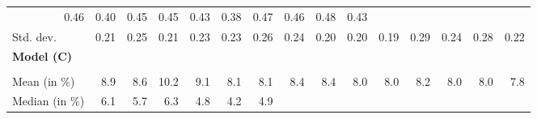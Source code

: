 \begin{tabular}{lllllllllllllll}
  \multicolumn{1}{r}{0.46} &
  \multicolumn{1}{r}{0.40} &
  \multicolumn{1}{r}{0.45} &
  \multicolumn{1}{r}{0.45} &
  \multicolumn{1}{r}{0.43} &
  \multicolumn{1}{r}{0.38} &
  \multicolumn{1}{r}{0.47} &
  \multicolumn{1}{r}{0.46} &
  \multicolumn{1}{r}{0.48} &
  \multicolumn{1}{r}{0.43} \\
\multicolumn{1}{l}{\hspace{2em}Std. dev.} &
  \multicolumn{1}{|r}{0.21} &
  \multicolumn{1}{r}{0.25} &
  \multicolumn{1}{r}{0.21} &
  \multicolumn{1}{r}{0.23} &
  \multicolumn{1}{r}{0.23} &
  \multicolumn{1}{r}{0.26} &
  \multicolumn{1}{r}{0.24} &
  \multicolumn{1}{r}{0.20} &
  \multicolumn{1}{r}{0.20} &
  \multicolumn{1}{r}{0.19} &
  \multicolumn{1}{r}{0.29} &
  \multicolumn{1}{r}{0.24} &
  \multicolumn{1}{r}{0.28} &
  \multicolumn{1}{r}{0.22} \\ \hline
\multicolumn{1}{l}{{\textbf{Model (C)}}} &
  \multicolumn{1}{|r}{} &
  \multicolumn{1}{r}{} &
  \multicolumn{1}{r}{} &
  \multicolumn{1}{r}{} &
  \multicolumn{1}{r}{} &
  \multicolumn{1}{r}{} &
  \multicolumn{1}{r}{} &
  \multicolumn{1}{r}{} &
  \multicolumn{1}{r}{} &
  \multicolumn{1}{r}{} &
  \multicolumn{1}{r}{} &
  \multicolumn{1}{r}{} &
  \multicolumn{1}{r}{} &
  \multicolumn{1}{r}{} \\ \hline
\multicolumn{1}{l}{\hspace{1em}{\textit{Additive term} ($\widehat{t}^{add}/\widetilde{p}$)}} &
  \multicolumn{1}{|r}{} &
  \multicolumn{1}{r}{} &
  \multicolumn{1}{r}{} &
  \multicolumn{1}{r}{} &
  \multicolumn{1}{r}{} &
  \multicolumn{1}{r}{} &
  \multicolumn{1}{r}{} &
  \multicolumn{1}{r}{} &
  \multicolumn{1}{r}{} &
  \multicolumn{1}{r}{} &
  \multicolumn{1}{r}{} &
  \multicolumn{1}{r}{} &
  \multicolumn{1}{r}{} &
  \multicolumn{1}{r}{} \\
\multicolumn{1}{l}{\hspace{2em}Mean (in $\%$)} &
  \multicolumn{1}{|r}{8.9} &
  \multicolumn{1}{r}{8.6} &
  \multicolumn{1}{r}{10.2} &
  \multicolumn{1}{r}{9.1} &
  \multicolumn{1}{r}{8.1} &
  \multicolumn{1}{r}{8.1} &
  \multicolumn{1}{r}{8.4} &
  \multicolumn{1}{r}{8.4} &
  \multicolumn{1}{r}{8.0} &
  \multicolumn{1}{r}{8.0} &
  \multicolumn{1}{r}{8.2} &
  \multicolumn{1}{r}{8.0} &
  \multicolumn{1}{r}{8.0} &
  \multicolumn{1}{r}{7.8} \\
\multicolumn{1}{l}{\hspace{2em}Median (in $\%$)} &
  \multicolumn{1}{|r}{6.1} &
  \multicolumn{1}{r}{5.7} &
  \multicolumn{1}{r}{6.3} &
  \multicolumn{1}{r}{4.8} &
  \multicolumn{1}{r}{4.2} &
  \multicolumn{1}{r}{4.9} &

\end{tabular}
